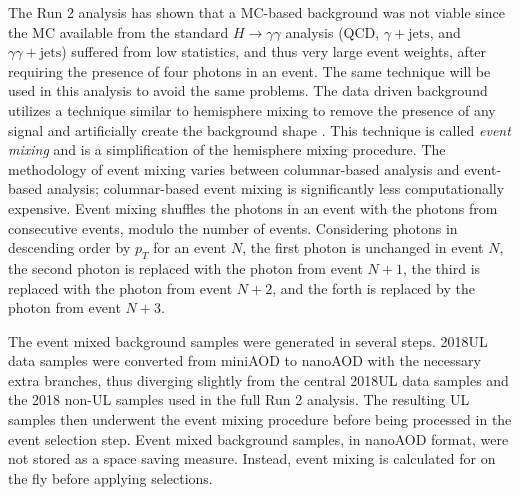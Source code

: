 \documentclass[12pt]{article}
\begin{document}
The Run 2 analysis has shown that a MC-based background was not viable since the MC available from the standard $H \rightarrow \gamma\gamma$ analysis (QCD, $\gamma + \mathrm{jets}$, and $\gamma\gamma + \mathrm{jets}$) suffered from low statistics, and thus very large event weights, after requiring the presence of four photons in an event. The same technique will be used in this analysis to avoid the same problems. The data driven background utilizes a technique similar to hemisphere mixing to remove the presence of any signal and artificially create the background shape \cite{hemisphere_mixing}. This technique is called \textit{event mixing} and is a simplification of the hemisphere mixing procedure. The methodology of event mixing varies between columnar-based analysis and event-based analysis; columnar-based event mixing is significantly less computationally expensive. Event mixing shuffles the photons in an event with the photons from consecutive events, modulo the number of events. Considering photons in descending order by $p_T$ for an event $N$, the first photon is unchanged in event $N$, the second photon is replaced with the photon from event $N+1$, the third is replaced with the photon from event $N+2$, and the forth is replaced by the photon from event $N+3$.\par

The event mixed background samples were generated in several steps. 2018UL data samples were converted from miniAOD to nanoAOD with the necessary extra branches, thus diverging slightly from the central 2018UL data samples and the 2018 non-UL samples used in the full Run 2 analysis. The resulting UL samples then underwent the event mixing procedure before being processed in the event selection step. Event mixed background samples, in nanoAOD format, were not stored as a space saving measure. Instead, event mixing is calculated for on the fly before applying selections.\par
\end{document}
